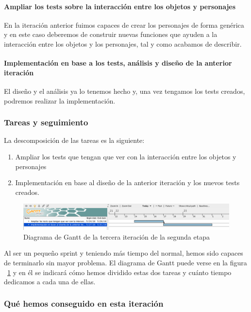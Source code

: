 \paragraph{Ampliar los tests sobre la interacción entre los objetos y personajes} En la iteración anterior fuimos capaces de crear los personajes de forma genérica y en este caso deberemos de construir nuevas funciones que ayuden a la interacción entre los objetos y los personajes, tal y como acabamos de describir.

\paragraph{Implementación en base a los tests, análisis y diseño de la anterior iteración} El diseño y el análisis ya lo tenemos hecho y, una vez tengamos los tests creados, podremos realizar la implementación.

\subsubsection{Tareas y seguimiento}

La descomposición de las tareas es la siguiente:

\begin{enumerate}[label=\bfseries WBS 3.\arabic*]
  \item Ampliar los tests que tengan que ver con la interacción entre los objetos y personajes
  \item Implementación en base al diseño de la anterior iteración y los nuevos tests creados.
\end{enumerate}

\begin{figure}
    \includegraphics[width=\textwidth,height=\textheight,keepaspectratio]{./img/sec2it3.png}
  \caption{Diagrama de Gantt de la tercera iteración de la segunda etapa}
  \label{fig:sec2it3}
\end{figure}

Al ser un pequeño sprint y teniendo más tiempo del normal, hemos sido capaces de terminarlo sin mayor problema. El diagrama de Gantt puede verse en la figura ~\ref{fig:sec2it3} y en él se indicará cómo hemos dividido estas dos tareas y cuánto tiempo dedicamos a cada una de ellas.

\subsubsection{Qué hemos conseguido en esta iteración}

